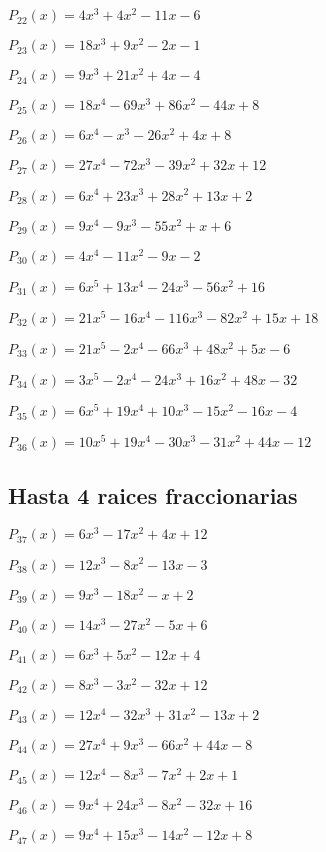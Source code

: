 \subitem $P_{22}(x) = 4x^3 + 4x^2 - 11x - 6$

\subitem $P_{23}(x) = 18x^3 + 9x^2 - 2x - 1$

\subitem $P_{24}(x) = 9x^3 + 21x^2 + 4x - 4$


\subitem $P_{25}(x) = 18x^4 - 69x^3 + 86x^2 - 44x + 8$

\subitem $P_{26}(x) = 6x^4 - x^3 - 26x^2 + 4x + 8$

\subitem $P_{27}(x) = 27x^4 - 72x^3 - 39x^2 + 32x + 12$

\subitem $P_{28}(x) = 6x^4 + 23x^3 + 28x^2 + 13x + 2$

\subitem $P_{29}(x) = 9x^4 - 9x^3 - 55x^2 + x + 6$

\subitem $P_{30}(x) = 4x^4 - 11x^2 - 9x - 2$


\subitem $P_{31}(x) = 6x^5 + 13x^4 - 24x^3 - 56x^2 + 16$

\subitem $P_{32}(x) = 21x^5 - 16x^4 - 116x^3 - 82x^2 + 15x + 18$

\subitem $P_{33}(x) = 21x^5 - 2x^4 - 66x^3 + 48x^2 + 5x - 6$

\subitem $P_{34}(x) = 3x^5 - 2x^4 - 24x^3 + 16x^2 + 48x - 32$

\subitem $P_{35}(x) = 6x^5 + 19x^4 + 10x^3 - 15x^2 - 16x - 4$

\subitem $P_{36}(x) = 10x^5 + 19x^4 - 30x^3 - 31x^2 + 44x - 12$

\subsection{Hasta 4 raices fraccionarias}

\subitem $P_{37}(x) = 6x^3 - 17x^2 + 4x + 12$

\subitem $P_{38}(x) = 12x^3 - 8x^2 - 13x - 3$

\subitem $P_{39}(x) = 9x^3 - 18x^2 - x + 2$

\subitem $P_{40}(x) = 14x^3 - 27x^2 - 5x + 6$

\subitem $P_{41}(x) = 6x^3 + 5x^2 - 12x + 4$

\subitem $P_{42}(x) = 8x^3 - 3x^2 - 32x + 12$


\subitem $P_{43}(x) = 12x^4 - 32x^3 + 31x^2 - 13x + 2$

\subitem $P_{44}(x) = 27x^4 + 9x^3 - 66x^2 + 44x - 8$

\subitem $P_{45}(x) = 12x^4 - 8x^3 - 7x^2 + 2x + 1$

\subitem $P_{46}(x) = 9x^4 + 24x^3 - 8x^2 - 32x + 16$

\subitem $P_{47}(x) = 9x^4 + 15x^3 - 14x^2 - 12x + 8$

